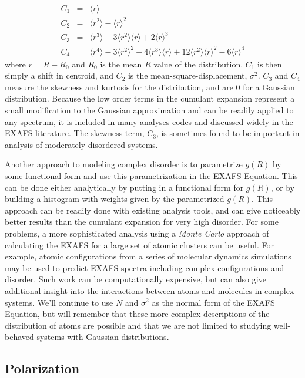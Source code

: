 \begin{eqnarray*}
  C_1  &  =& \langle r \rangle \\
  C_2  &  =& \langle r^2 \rangle - \langle r \rangle^2 \\
  C_3  &  =& \langle r^3 \rangle - 3 \langle r^2 \rangle  \langle r \rangle  + 2 \langle r \rangle^3     \\
  C_4  & = & \langle r^4 \rangle - 3 \langle r^2 \rangle^2  - 4\langle r^3 \rangle \langle r \rangle
      +12  \langle r^2 \rangle  \langle r \rangle^2   - 6\langle r \rangle^4
\end{eqnarray*}
\noindent where $r= R - R_0$ and $R_0$ is the mean $R$ value of the
distribution.  $C_1$ is then simply a shift in centroid, and $C_2$ is the
mean-square-displacement, $\sigma^2$. $C_3$ and $C_4$ measure the skewness
and kurtosis for the distribution, and are 0 for a Gaussian distribution.
Because the low order terms in the cumulant expansion represent a small
modification to the Gaussian approximation and can be readily applied to
any spectrum, it is included in many analyses codes and discussed widely in
the EXAFS literature.  The skewness term, $C_3$, is sometimes found to be
important in analysis of moderately disordered systems.

Another approach to modeling complex disorder is to parametrize $g(R)$ by
some functional form and use this parametrization in the EXAFS Equation.
This can be done either analytically by putting in a functional form for
$g(R)$\cite{gnxas}, or by building a histogram with weights given by the
parametrized $g(R)$.  This approach can be readily done with existing
analysis tools, and can give noticeably better results than the cumulant
expansion for very high disorder.  For some problems, a more sophisticated
analysis using a {\emph{Monte Carlo}} approach of calculating the EXAFS for
a large set of atomic clusters can be useful.  For example, atomic
configurations from a series of molecular dynamics simulations may be used
to predict EXAFS spectra including complex configurations and disorder.
Such work can be computationally expensive, but can also give additional
insight into the interactions between atoms and molecules in complex
systems.  We'll continue to use $N$ and $\sigma^2$ as the normal form of
the EXAFS Equation, but will remember that these more complex descriptions
of the distribution of atoms are possible and that we are not limited to
studying well-behaved systems with Gaussian distributions.


\subsection{Polarization}


